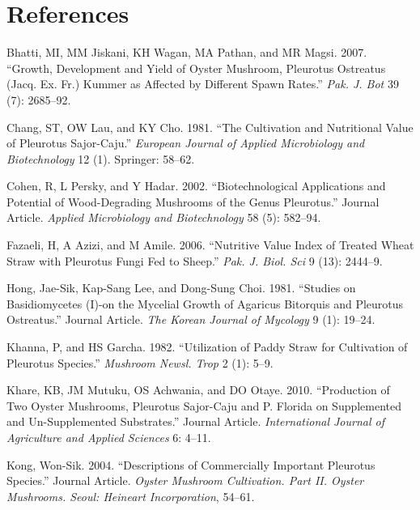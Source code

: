 \documentclass[]{article}
\begin{document}
\hypertarget{references}{%
\section*{References}\label{references}}

\hypertarget{refs}{}
\leavevmode\hypertarget{ref-bhatti2007growth}{}%
Bhatti, MI, MM Jiskani, KH Wagan, MA Pathan, and MR Magsi. 2007. ``Growth, Development and Yield of Oyster Mushroom, Pleurotus Ostreatus (Jacq. Ex. Fr.) Kummer as Affected by Different Spawn Rates.'' \emph{Pak. J. Bot} 39 (7): 2685--92.

\leavevmode\hypertarget{ref-chang1981cultivation}{}%
Chang, ST, OW Lau, and KY Cho. 1981. ``The Cultivation and Nutritional Value of Pleurotus Sajor-Caju.'' \emph{European Journal of Applied Microbiology and Biotechnology} 12 (1). Springer: 58--62.

\leavevmode\hypertarget{ref-cohen2002}{}%
Cohen, R, L Persky, and Y Hadar. 2002. ``Biotechnological Applications and Potential of Wood-Degrading Mushrooms of the Genus Pleurotus.'' Journal Article. \emph{Applied Microbiology and Biotechnology} 58 (5): 582--94.

\leavevmode\hypertarget{ref-fazaeli2006nutritive}{}%
Fazaeli, H, A Azizi, and M Amile. 2006. ``Nutritive Value Index of Treated Wheat Straw with Pleurotus Fungi Fed to Sheep.'' \emph{Pak. J. Biol. Sci} 9 (13): 2444--9.

\leavevmode\hypertarget{ref-hong1981}{}%
Hong, Jae-Sik, Kap-Sang Lee, and Dong-Sung Choi. 1981. ``Studies on Basidiomycetes (I)-on the Mycelial Growth of Agaricus Bitorquis and Pleurotus Ostreatus.'' Journal Article. \emph{The Korean Journal of Mycology} 9 (1): 19--24.

\leavevmode\hypertarget{ref-khanna1982utilization}{}%
Khanna, P, and HS Garcha. 1982. ``Utilization of Paddy Straw for Cultivation of Pleurotus Species.'' \emph{Mushroom Newsl. Trop} 2 (1): 5--9.

\leavevmode\hypertarget{ref-khare2010}{}%
Khare, KB, JM Mutuku, OS Achwania, and DO Otaye. 2010. ``Production of Two Oyster Mushrooms, Pleurotus Sajor-Caju and P. Florida on Supplemented and Un-Supplemented Substrates.'' Journal Article. \emph{International Journal of Agriculture and Applied Sciences} 6: 4--11.

\leavevmode\hypertarget{ref-kong2004}{}%
Kong, Won-Sik. 2004. ``Descriptions of Commercially Important Pleurotus Species.'' Journal Article. \emph{Oyster Mushroom Cultivation. Part II. Oyster Mushrooms. Seoul: Heineart Incorporation}, 54--61.
\end{document}
